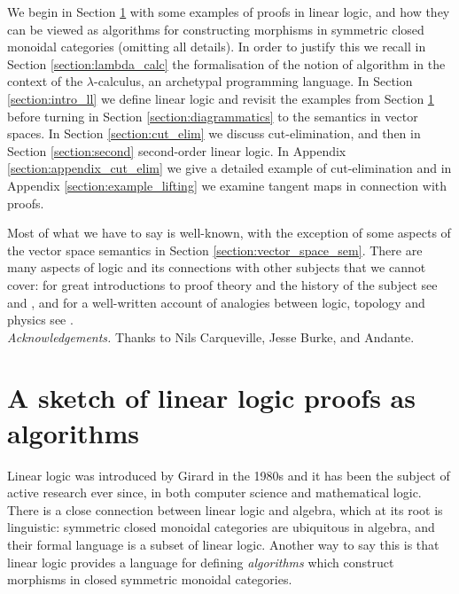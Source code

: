\documentclass[english,letter paper,12pt,reqno]{article}
\theoremstyle{example}
\numberwithin{equation}{section}
\begin{document}
We begin in Section \ref{section:sketch} with some examples of proofs in linear logic, and how they can be viewed as algorithms for constructing morphisms in symmetric closed monoidal categories (omitting all details). In order to justify this we recall in Section \ref{section:lambda_calc} the formalisation of the notion of algorithm in the context of the $\lambda$-calculus, an archetypal programming language. In Section \ref{section:intro_ll} we define linear logic and revisit the examples from Section \ref{section:sketch} before turning in Section \ref{section:diagrammatics} to the semantics in vector spaces. In Section \ref{section:cut_elim} we discuss cut-elimination, and then in Section \ref{section:second} second-order linear logic. In Appendix \ref{section:appendix_cut_elim} we give a detailed example of cut-elimination and in Appendix \ref{section:example_lifting} we examine tangent maps in connection with proofs.

Most of what we have to say is well-known, with the exception of some aspects of the vector space semantics in Section \ref{section:vector_space_sem}. There are many aspects of logic and its connections with other subjects that we cannot cover: for great introductions to proof theory and the history of the subject see \cite[Chapter 1]{girard_prooftypes} and \cite[\S 1]{mellies}, and for a well-written account of analogies between logic, topology and physics see \cite{baez}.
\\

\emph{Acknowledgements.} Thanks to Nils Carqueville, Jesse Burke, and Andante.
\\

\section{A sketch of linear logic proofs as algorithms}\label{section:sketch}

Linear logic was introduced by Girard in the 1980s \cite{girard_llogic} and it has been the subject of active research ever since, in both computer science and mathematical logic. There is a close connection between linear logic and algebra, which at its root is linguistic: symmetric closed monoidal categories are ubiquitous in algebra, and their formal language is a subset of linear logic. Another way to say this is that linear logic provides a language for defining \emph{algorithms} which construct morphisms in closed symmetric monoidal categories.
\end{document}
